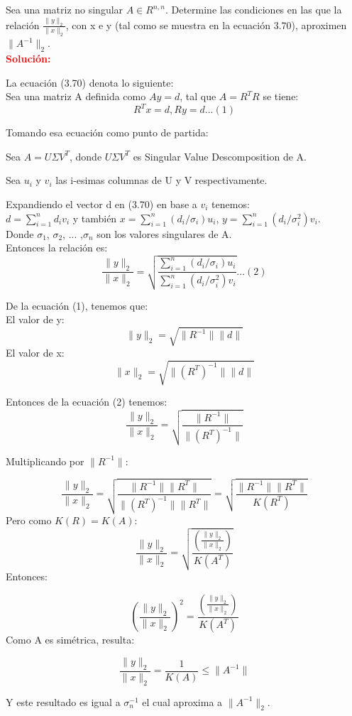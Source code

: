 Sea una matriz no singular $A \in R^{n, n}$. Determine las condiciones en las que la relación
$\frac{\|y\|_2}{\|x\|_2}$, con x e y (tal como se muestra en la ecuación 3.70), aproximen $\|A^{-1}\|_2$.\\

\noindent \textcolor{red}{\bf Solución:}

La ecuación (3.70) denota lo siguiente:\\

Sea una matriz A definida como $Ay=d$, tal que $A = R^T R$ se tiene:
$$
  R^T x = d, Ry=d ...(1)
$$

Tomando esa ecuación como punto de partida:

Sea $A = U \Sigma V^T$, donde $U \Sigma V^T$ es Singular Value Descomposition de A.

Sea $u_i$ y $v_i$ las i-esimas columnas de U y V respectivamente.

Expandiendo el vector d en (3.70) en base a $v_i$ tenemos:\\

$d=\sum_{i=1}^{n} d_i v_i$ y también $x =\sum_{i=1}^{n} (d_i/\sigma_i) u_i$, $y=\sum_{i=1}^{n} (d_i/\sigma_i ^2)v_i$.\\

Donde $\sigma_1$, $\sigma_2$, ... ,$\sigma_n$ son los valores singulares de A.\\

Entonces la relación es:
$$
  \frac{\|y\|_2}{\|x\|_2} = \sqrt{\frac{\sum_{i=1}^{n} (d_i/\sigma_i) u_i}{\sum_{i=1}^{n} (d_i/\sigma_i ^2)v_i}} ...(2)
$$

De la ecuación (1), tenemos que:\\
El valor de y:
$$
  \|y\|_2 = \sqrt{\|R^{-1}\| \|d\|}
$$
El valor de x:
$$
  \|x\|_2 = \sqrt{\|(R^T)^{-1}\| \|d\|}
$$

Entonces de la ecuación (2) tenemos:
$$
  \frac{\|y\|_2}{\|x\|_2} = \sqrt{\frac{\|R^{-1}\|}{\|(R^T)^{-1}\|}}
$$

Multiplicando por $\|R^{-1}\|$:

$$
  \frac{\|y\|_2}{\|x\|_2} = \sqrt{\frac{\|R^{-1}\| \|R^{T}\|}{\|(R^T)^{-1}\| \|R^{T}\|}} = \sqrt{\frac{\|R^{-1}\| \|R^{T}\|}{K(R^{T})}}
$$
Pero como $K(R) = K(A)$:
$$
  \frac{\|y\|_2}{\|x\|_2} = \sqrt{\frac{(\frac{\|y\|_2}{\|x\|_2})}{K(A^T)}} 
$$
Entonces:

$$
  (\frac{\|y\|_2}{\|x\|_2})^2 = \frac{(\frac{\|y\|_2}{\|x\|_2})}{K(A^T)}
$$
Como A es simétrica, resulta:

$$
  \frac{\|y\|_2}{\|x\|_2} = \frac{1}{K(A)} \leq \|A^{-1}\|
$$

Y este resultado es igual a $\sigma_n ^{-1}$ el cual aproxima a $\|A^{-1}\|_2$.